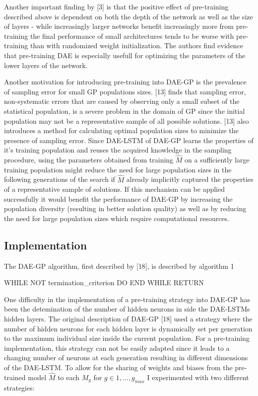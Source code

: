 \documentclass[
  11pt,
]{article}
\newenvironment{Shaded}{\begin{snugshade}}{\end{snugshade}}
\newcommand{\NormalTok}[1]{#1}
\begin{document}
Another important finding by {[}3{]} is that the positive effect of
pre-training described above is dependent on both the depth of the
network as well as the size of layers - while increasingly larger
networks benefit increasingly more from pre-training the final
performance of small architectures tends to be worse with pre-training
than with randomized weight initialization. The authors find evidence
that pre-training DAE is especially usefull for optimizing the
parameters of the lower layers of the network.

Another motivation for introducing pre-training into DAE-GP is the
prevalence of sampling error for small GP populations sizes. {[}13{]}
finds that sampling error, non-systematic errors that are caused by
observing only a small subset of the statistical population, is a severe
problem in the domain of GP since the initial population may not be a
representative sample of all possible solutions. {[}13{]} also
introduces a method for calculating optimal population sizes to minimize
the presence of sampling error. Since DAE-LSTM of DAE-GP learns the
properties of it's training population and reuses the acquired knowledge
in the sampling procedure, using the parameters obtained from training
\(\hat{M}\) on a sufficiently large training population might reduce the
need for large population sizes in the following generations of the
search if \(\hat{M}\) already implicitly captured the properties of a
representative sample of solutions. If this mechanism can be applied
successfully it would benefit the performance of DAE-GP by increasing
the population diversity (resulting in better solution quality) as well
as by reducing the need for large population sizes which require
computational resources.

\hypertarget{implementation}{%
\subsection{Implementation}\label{implementation}}

The DAE-GP algorithm, first described by {[}18{]}, is described by
algorithm 1

\begin{Shaded}
\begin{Highlighting}[numbers=left,,]
\NormalTok{WHILE NOT termination\_criterion}
\NormalTok{  DO }
\NormalTok{END WHILE}
\NormalTok{RETURN}
\end{Highlighting}
\end{Shaded}

One difficulty in the implementation of a pre-training strategy into
DAE-GP has been the detemination of the number of hidden neurons in side
the DAE-LSTMs hidden layers. The original description of DAE-GP {[}18{]}
used a strategy where the number of hidden neurons for each hidden layer
is dynamically set per generation to the maximum individual size inside
the current population. For a pre-training implementation, this strategy
can not be easily adapted since it leads to a changing number of neurons
at each generation resulting in different dimensions of the DAE-LSTM. To
allow for the sharing of weights and biases from the pre-trained model
\(\hat{M}\) to each \(M_g\) for \(g\in{1,...,g_{max}}\) I experimented
with two different strategies:
\end{document}
